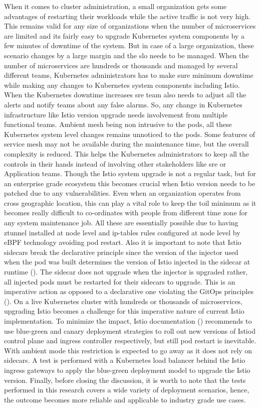 When it comes to cluster administration, a small organization gets some advantages of restarting their workloads while the active traffic is not very high. This remains valid for any size of organizations when the number of microservices are limited and its fairly easy to upgrade Kubernetes system components by a few minutes of downtime of the system. But in case of a large organization, these scenario changes by a large margin and the \acrlong{slo} needs to be managed. When the number of microservices are hundreds or thousands and managed by several different teams, Kubernetes administrators has to make sure minimum downtime while making any changes to Kubernetes system components including Istio. When the Kubernetes downtime increases \acrlong{sre} team also needs to adjust all the alerts and notify teams about any false alarms. So, any change in Kubernetes infrastructure like Istio version upgrade needs involvement from multiple functional teams. Ambient mesh being non intrusive to the pods, all these Kubernetes system level changes remains unnoticed to the pods. Some features of service mesh may not be available during the maintenance time, but the overall complexity is reduced. This helps the Kubernetes administrators to keep all the controls in their hands instead of involving other stakeholders like \acrshort{sre} or Application teams. Though the Istio system upgrade is not a regular task, but for an enterprise grade ecosystem this becomes crucial when Istio version needs to be patched due to any vulnerabilities. Even when an organization operates from cross geographic location, this can play a vital  role to keep the toil minimum as it becomes really difficult to co-ordinates with people from different time zone for any system maintenance job. All these are essentially possible due to having ztunnel installed at node level and ip-tables rules configured at node level by eBPF technology avoiding pod restart. Also it is important to note that Istio sidecars break the declarative principle since the version of the injector used when the pod was built determines the version of Istio injected in the sidecar at runtime (\cite{gitMitch2023}). The sidecar does not upgrade when the injector is upgraded rather, all injected pods must be restarted for their sidecars to upgrade. This is an imperative action as opposed to a declarative one violating the GitOps principles (\cite{gitopsBook}). On a live Kubernetes cluster with hundreds or thousands of microservices, upgrading Istio becomes a challenge for this imperative nature of current Istio implementation. To minimize the impact, Istio documentation (\cite{istioDocCanaryUpgrade}) recommends to use blue-green and canary deployment strategies to roll out new versions of Istiod control plane and ingress controller respectively, but still pod restart is inevitable. With ambient mode this restriction is expected to go away as it does not rely on sidecars. A test is performed with a Kubernetes load balancer behind the Istio ingress gateways to apply the blue-green deployment model to upgrade the Istio version. Finally, before closing the discussion, it is worth to note that the tests performed in this research covers a wide variety of deployment scenarios, hence, the outcome becomes more reliable and applicable to industry grade use cases.
